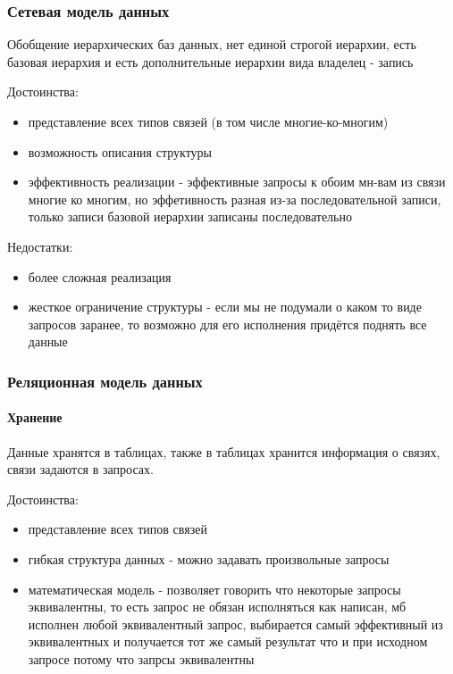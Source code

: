 \subsubsection{Сетевая модель данных}
Обобщение иерархических баз данных, нет единой
строгой иерархии, есть базовая иерархия и есть
дополнительные иерархии вида владелец - запись

\enewline

Достоинства:
\begin{itemize}
    \item представление всех типов связей (в том
числе многие-ко-многим)
    \item возможность описания структуры
    \item эффективность реализации - эффективные
запросы к обоим мн-вам из связи многие ко многим,
но эффетивность разная из-за последовательной записи,
только записи базовой иерархии записаны последовательно
\end{itemize}

Недостатки:
\begin{itemize}
    \item более сложная реализация
    \item жесткое ограничение структуры - если мы
не подумали о каком то виде запросов заранее, то
возможно для его исполнения придётся поднять все данные
\end{itemize}

\subsubsection{Реляционная модель данных}
\paragraph{Хранение}
Данные хранятся в таблицах, также в таблицах хранится
информация о связях, связи задаются в запросах.

\enewline

Достоинства:
\begin{itemize}
    \item представление всех типов связей
    \item гибкая структура данных - можно задавать
произвольные запросы
    \item математическая модель - позволяет говорить
что некоторые запросы эквивалентны, то есть запрос
не обязан исполняться как написан, мб исполнен любой
эквивалентный запрос, выбирается самый эффективный из
эквивалентных и получается тот же самый результат что
и при исходном запросе потому что запрсы эквивалентны
\end{itemize}

